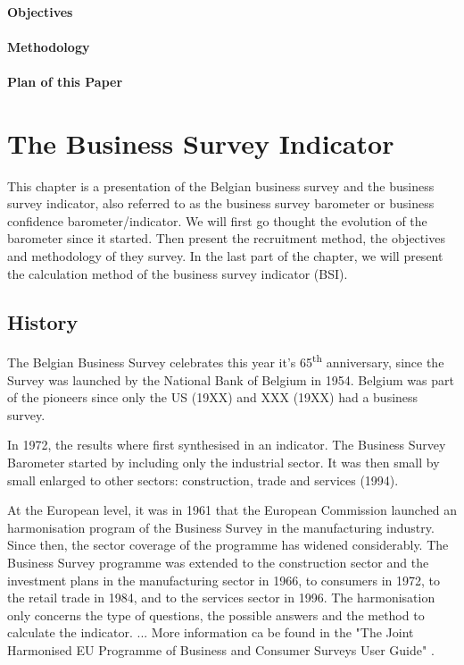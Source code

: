 \documentclass[12pt,a4paper,oneside]{book}
\begin{document}
\subsubsection{Objectives}

\subsubsection{Methodology}

\subsubsection{Plan of this Paper}



\chapter{The Business Survey Indicator}

This chapter is a presentation of the Belgian business survey and the business survey indicator, also referred to as the business survey barometer or business confidence barometer/indicator.
We will first go thought the evolution of the barometer since it started. Then present the recruitment method, the objectives and methodology of they survey. 
In the last part of the chapter, we will present the calculation method of the business survey indicator (BSI).

\section{History}

The Belgian Business Survey celebrates this year it's 65\textsuperscript{th} anniversary, since the Survey was launched by the National Bank of Belgium in 1954. 
Belgium was part of the pioneers since only the US (19XX) and XXX (19XX) had a business survey.

In 1972, the results where first synthesised in an indicator.
The Business Survey Barometer started by including only the industrial sector. It was then small by small enlarged to other sectors: construction, trade and services (1994).

At the European level, it was in 1961 that the European Commission launched an harmonisation program of the Business Survey in the manufacturing industry. 
Since then, the sector coverage of the programme has widened considerably. The Business Survey programme was extended to the construction sector and the investment plans in the manufacturing sector in 1966, to consumers in 1972, to the retail trade in 1984, and to the services sector in 1996.
The harmonisation only concerns the type of questions, the possible answers and the method to calculate the indicator. ...
More information ca be found in the "The Joint Harmonised EU Programme of Business and Consumer Surveys User Guide" \cite{european_commission_joint_2016}.
\end{document}
